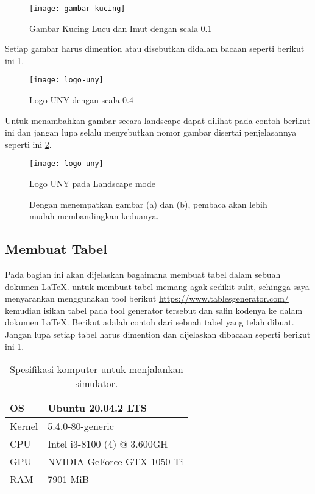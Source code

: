 \begin{figure}[H]
    \centering
    \texttt{[image: gambar-kucing]}
    \caption{Gambar Kucing Lucu dan Imut dengan scala 0.1}
    \label{fig:kucing}
\end{figure}

Setiap gambar harus dimention atau disebutkan didalam bacaan seperti berikut ini \cref{fig:kucing}.

\begin{figure}[H]
    \centering
    \texttt{[image: logo-uny]}
    \caption{Logo UNY dengan scala 0.4}
    \label{fig:logoUNY}
\end{figure}

Untuk menambahkan gambar secara landscape dapat dilihat pada contoh berikut ini dan jangan lupa selalu menyebutkan nomor gambar disertai penjelasannya seperti ini \cref{fig:logoUNY}.

\begin{sidewaysfigure}[htbp]
	\centering
	\texttt{[image: logo-uny]}
	\caption{Logo UNY pada Landscape mode}
    \label{fig:logoUNYlandscape}
\end{sidewaysfigure}

\begin{figure}[H]
    \centering
    \hspace{0.1\linewidth}
    \caption{Dengan menempatkan gambar (a) dan (b), pembaca akan lebih mudah membandingkan keduanya.}
    \label{fig:kucingdanUNY}
\end{figure}

\subsection{Membuat Tabel}
Pada bagian ini akan dijelaskan bagaimana membuat tabel dalam sebuah dokumen \LaTeX. untuk membuat tabel memang agak sedikit sulit, sehingga saya menyarankan menggunakan tool berikut \url{https://www.tablesgenerator.com/} kemudian isikan tabel pada tool generator tersebut dan salin kodenya ke dalam dokumen \LaTeX. Berikut adalah contoh dari sebuah tabel yang telah dibuat. Jangan lupa setiap tabel harus dimention dan dijelaskan dibacaan seperti berikut ini \cref{tab:spekPC}.


\begin{longtable}{|p{2cm}|p{7cm}|}
    \caption{Spesifikasi komputer untuk menjalankan simulator.}
    \label{tab:spekPC} \\
    \hline
    OS     & Ubuntu 20.04.2 LTS             \\ \hline
    Kernel & 5.4.0-80-generic               \\ \hline
    CPU    & Intel i3-8100 (4) @ 3.600GH    \\ \hline
    GPU    & NVIDIA GeForce GTX 1050 Ti     \\ \hline
    RAM    & 7901 MiB                       \\ \hline
\end{longtable}

